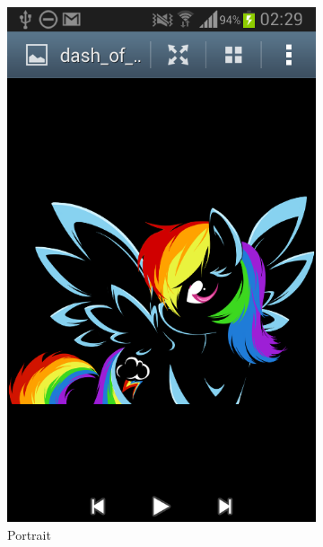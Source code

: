 \documentclass[a4paper,11pt]{article}
\begin{document}
\begin{figure}[p]
	\begin{subfigure}{0.5\textwidth}
		\centering
		\includegraphics[scale=0.3]{scr1}
		\caption{Portrait}
		\label{flp}
	\end{subfigure}
	~
	\begin{subfigure}{0.5\textwidth}
		\centering

\end{subfigure}
\end{figure}
\end{document}

